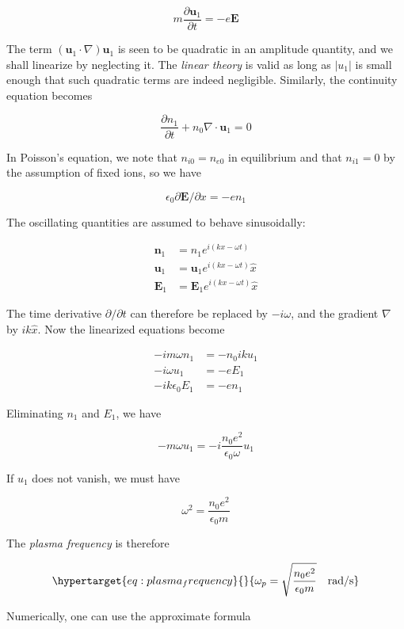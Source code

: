\documentclass[
  notoc %
]{tufte-book}
\begin{document}
\[
m\frac{\partial \mathbf{u}_1}{\partial t} = -e\mathbf{E}
\]

The term \((\mathbf{u}_1\cdot\nabla)\mathbf{u}_1\) is seen to be
quadratic in an amplitude quantity, and we shall linearize by neglecting
it. The \emph{linear theory} is valid as long as \(|u_1|\) is small
enough that such quadratic terms are indeed negligible. Similarly, the
continuity equation becomes

\[
\frac{\partial n_1}{\partial t} + n_0 \nabla\cdot\mathbf{u}_1 = 0
\]

In Poisson's equation, we note that \(n_{i0}=n_{e0}\) in equilibrium and
that \(n_{i1}=0\) by the assumption of fixed ions, so we have

\[
\epsilon_0 \partial \mathbf{E}/\partial x = -en_1
\]

The oscillating quantities are assumed to behave sinusoidally:

\[
\begin{aligned}
\mathbf{n}_1 &= n_1 e^{i(kx-\omega t)} \\
\mathbf{u}_1 &= \mathbf{u}_1 e^{i(kx-\omega t)}\hat{x} \\
\mathbf{E}_1 &= \mathbf{E}_1 e^{i(kx-\omega t)}\hat{x}
\end{aligned}
\]

The time derivative \(\partial/\partial t\) can therefore be replaced by
\(-i\omega\), and the gradient \(\nabla\) by \(ik\hat{x}\). Now the
linearized equations become

\[
\begin{aligned}
-im\omega n_1 &= -n_0 ik u_1 \\
-i\omega u_1 &= -eE_1 \\
-ik\epsilon_0 E_1 &= -en_1
\end{aligned}
\]

Eliminating \(n_1\) and \(E_1\), we have

\[
-m\omega u_1 = -i\frac{n_0e^2}{\epsilon_0 \omega}u_1
\]

If \(u_1\) does not vanish, we must have

\[
\omega^2 = \frac{n_0 e^2}{\epsilon_0 m}
\]

The \emph{plasma frequency} is therefore

\begin{equation}\protect\hypertarget{eq:plasma_frequency}{}{
\omega_p = \sqrt{\frac{n_0 e^2}{\epsilon_0 m}} \quad \text{rad/s}
}\label{eq:plasma_frequency}\end{equation}

Numerically, one can use the approximate formula
\end{document}
